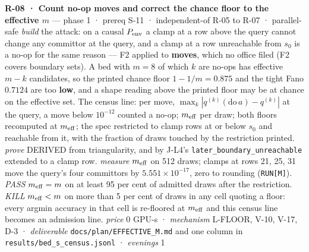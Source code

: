 \documentclass[11pt,a4paper]{article}
\theoremstyle{plain}
\theoremstyle{definition}
\theoremstyle{remark}
\begin{document}
\textbf{R-08 · Count no-op moves and correct the chance floor to the
effective \(m\)} --- phase 1 · prereq S-11 · independent-of R-05 to R-07
· parallel-safe \emph{build} the attack: on a causal \(P_{\rm env}\) a
clamp at a row above the query cannot change any committor at the query,
and a clamp at a row unreachable from \(s_0\) is a no-op for the same
reason --- F2 applied to \textbf{moves}, which no office filed (F2
covers boundary sets). A bed with \(m=8\) of which \(k\) are no-ops has
effective \(m-k\) candidates, so the printed chance floor
\(1-1/m=0.875\) and the tight Fano \(0.7124\) are too \textbf{low}, and
a shape reading above the printed floor may be at chance on the
effective set. The census line: per move,
\(\max_k|q^{(k)}(\mathrm{do}\,a)-q^{(k)}|\) at the query, a move below
\(10^{-12}\) counted a no-op; \(m_{\rm eff}\) per draw; both floors
recomputed at \(m_{\rm eff}\); the spec restricted to clamp rows at or
below \(s_0\) and reachable from it, with the fraction of draws touched
by the restriction printed. \emph{prove} DERIVED from triangularity, and
by J-L4's \texttt{later\_boundary\_unreachable} extended to a clamp row.
\emph{measure} \(m_{\rm eff}\) on 512 draws; clamps at rows 21, 25, 31
move the query's four committors by \(5.551\times10^{-17}\), zero to
rounding (\texttt{RUN{[}M{]}}). \emph{PASS} \(m_{\rm eff}=m\) on at
least 95 per cent of admitted draws after the restriction. \emph{KILL}
\(m_{\rm eff}<m\) on more than 5 per cent of draws in any cell quoting a
floor: every argmin accuracy in that cell is re-floored at
\(m_{\rm eff}\) and this census line becomes an admission line.
\emph{price} \(0\) GPU-s · \emph{mechanism} L-FLOOR, V-10, V-17, D-3 ·
\emph{deliverable} \texttt{docs/plan/EFFECTIVE\_M.md} and one column in
\texttt{results/bed\_s\_census.jsonl} · \emph{evenings} 1
\end{document}
